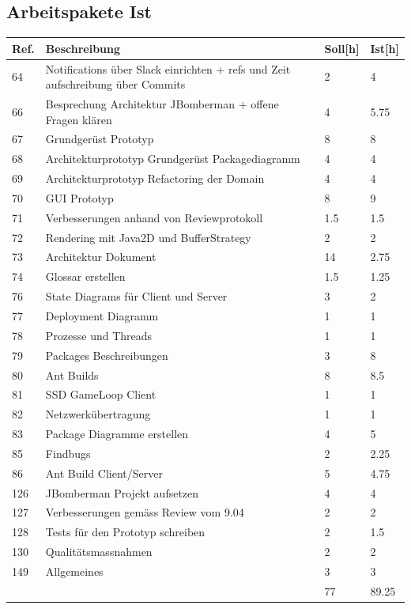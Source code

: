 \documentclass[11pt]{scrartcl}
\begin{document}
  \subsection{Arbeitspakete Ist}
  \begin{tabularx} {\linewidth}{lXll}
    \bf{Ref.}  & \bf{Beschreibung} & \bf{Soll[h]}  & \bf{Ist[h]}\\
    \hline
    64 & Notifications über Slack einrichten + refs und Zeit aufschreibung über Commits & 2 & 4 \\
    66 & Besprechung Architektur JBomberman + offene Fragen klären & 4 & 5.75\\
    67 &  Grundgerüst Prototyp & 8 & 8\\
    68 & Architekturprototyp Grundgerüst Packagediagramm & 4 & 4\\
    69 &  Architekturprototyp Refactoring der Domain & 4 & 4\\
    70 & GUI Prototyp & 8 & 9\\
    71 & 	Verbesserungen anhand von Reviewprotokoll & 1.5 & 1.5\\
    72 & Rendering mit Java2D und BufferStrategy & 2 & 2\\
    73 & Architektur Dokument & 14 & 2.75\\
    74 & Glossar erstellen  & 1.5 & 1.25\\
    76 & State Diagrams für Client und Server & 3 & 2\\
    77 & Deployment Diagramm & 1 & 1\\
    78 & 	Prozesse und Threads & 1 & 1\\
    79 & 	Packages Beschreibungen & 3 & 8\\
    80 & Ant Builds & 8 & 8.5\\
    81 & SSD GameLoop Client & 1 & 1\\
    82 & Netzwerkübertragung & 1 & 1\\
    83 & Package Diagramme erstellen & 4 & 5\\
    85 & 	Findbugs & 2 & 2.25\\
    86 & Ant Build Client/Server & 5 & 4.75\\
    126 & JBomberman Projekt aufsetzen & 4 & 4\\
    127 & Verbesserungen gemäss Review vom 9.04 & 2 & 2\\
    128 & Tests für den Prototyp schreiben & 2 & 1.5 \\
    130 & Qualitätsmassnahmen	& 2 & 2\\
    149 & Allgemeines & 3 & 3 \\
    \hline
    & & 77 & 89.25
    \end{tabularx}
\end{document}
